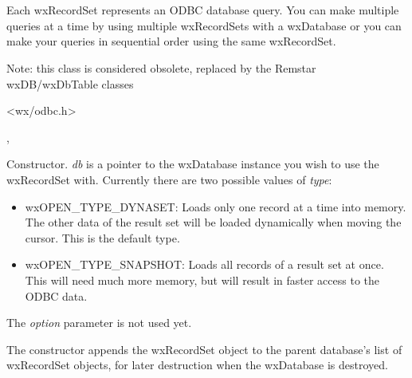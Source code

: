 \section{}\label{wxrecordset}

Each wxRecordSet represents an ODBC database query. You can make multiple queries
at a time by using multiple wxRecordSets with a wxDatabase or you can make
your queries in sequential order using the same wxRecordSet.

Note: this class is considered obsolete, replaced by the Remstar 
wxDB/wxDbTable classes




<wx/odbc.h>


, 




Constructor. {\it db} is a pointer to the wxDatabase instance you wish to use the
wxRecordSet with. Currently there are two possible values of {\it type}:

\begin{itemize}\itemsep=0pt
\item wxOPEN\_TYPE\_DYNASET: Loads only one record at a time into memory. The other
data of the result set will be loaded dynamically when
moving the cursor. This is the default type.
\item wxOPEN\_TYPE\_SNAPSHOT: Loads all records of a result set at once. This will
need much more memory, but will result in
faster access to the ODBC data.
\end{itemize}

The {\it option} parameter is not used yet.

The constructor appends the wxRecordSet object to the parent database's list of
wxRecordSet objects, for later destruction when the wxDatabase is destroyed.



